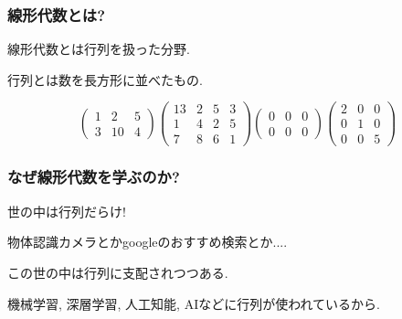 \documentclass[11pt,dvipdfmx]{beamer}
\theoremstyle{definition}
\theoremstyle{remark}
\begin{document}
\begin{frame}
\frametitle{線形代数とは?}

   \begin{alertblock}{}
  \begin{center}
 線形代数とは行列を扱った分野.
  \end{center}
 \end{alertblock}
 
 行列とは数を長方形に並べたもの.
 
 $$
  \begin{pmatrix}
 1 &2&5 \\
 3&10&4
 \end{pmatrix}
  \begin{pmatrix}
 13 &2&5&3 \\
 1 &4&2&5 \\
  7&8&6&1 
 \end{pmatrix}
  \begin{pmatrix}
0 &0&0\\
0 &0&0
 \end{pmatrix}
    \begin{pmatrix}
2&0 &0\\
0 &1 &0\\
0&0&5
 \end{pmatrix}
 $$
\end{frame}

\begin{frame}
\frametitle{なぜ線形代数を学ぶのか?}

   \begin{alertblock}{}
  \begin{center}
世の中は行列だらけ!
  \end{center}
 \end{alertblock}
 物体認識カメラとかgoogleのおすすめ検索とか....
 
 \vspace{20pt}
      \begin{alertblock}{}
  \begin{center}
この世の中は行列に支配されつつある.
  \end{center}
 \end{alertblock}
   機械学習, 深層学習, 人工知能, AIなどに行列が使われているから.
 

\end{frame}
\end{document}
